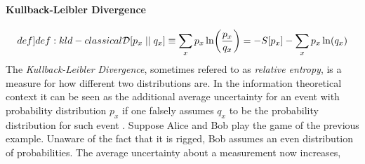 \documentclass{book}
\numberwithin{equation}{section} %
\begin{document}
\paragraph{Kullback-Leibler Divergence} 
\begin{align}\label[def]{def:kld-classical}
    \mathcal{D}[p_x\mid\mid q_x] \equiv \sum\limits_x p_x\ln(\frac{p_x}{q_x}) = -S[p_x] - \sum\limits_x p_x\ln(q_x)
\end{align}
The \emph{Kullback-Leibler Divergence}, sometimes refered to as \emph{relative entropy}, is a measure for how different two distributions are.
In the information theoretical context it can be seen as the additional average uncertainty for an event with probability distribution $p_x$
if one falsely assumes $q_x$ to be the probability distribution for such event \cite{HS_BA_SeifertSkript, BA_kl-divergence}.
Suppose Alice and Bob play the game of the previous example. Unaware of the fact that it is rigged, Bob assumes an even distribution of probabilities.
The average uncertainty about a measurement now increases, 
\end{document}
